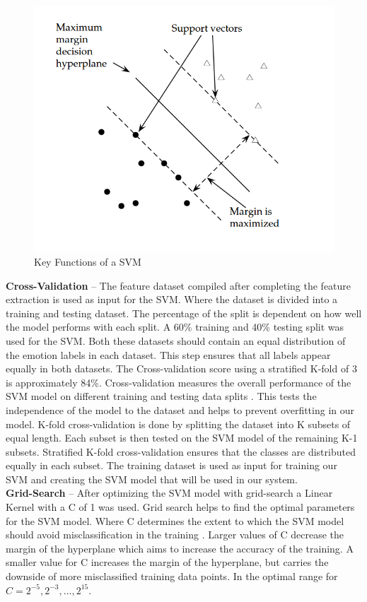 \begin{itemize}
\begin{figure}[H]
  \centering
  \includegraphics[scale=0.6]{svm}
  \caption{Key Functions of a SVM \cite{stan}}
  \label{fig: svm}
\end{figure} 

\textbf{Cross-Validation} -- The feature dataset compiled after completing the feature extraction is used as input for the SVM. Where the dataset is divided into a training and testing dataset. The percentage of the split is dependent on how well the model performs with each split. A 60\% training and 40\% testing split was used for the SVM. Both these datasets should contain an equal distribution of the emotion labels in each dataset. This step ensures that all labels appear equally in both datasets. The Cross-validation score using a stratified K-fold of 3 is approximately 84\%. Cross-validation measures the overall performance of the SVM model on different training and testing data splits \cite{svm}. This tests the independence of the model to the dataset and helps to prevent overfitting in our model. K-fold cross-validation is done by splitting the dataset into K subsets of equal length. Each subset is then tested on the SVM model of the remaining K-1 subsets. Stratified K-fold cross-validation ensures that the classes are distributed equally in each subset. The training dataset is used as input for training our SVM and creating the SVM model that will be used in our system.\\

\textbf{Grid-Search} -- After optimizing the SVM model with grid-search a Linear Kernel with a C of 1 was used. Grid search helps to find the optimal parameters for the SVM model. Where C determines the extent to which the SVM model should avoid misclassification in the training \cite{svm}. Larger values of C decrease the margin of the hyperplane which aims to increase the accuracy of the training. A smaller value for C increases the margin of the hyperplane, but carries the downside of more misclassified training data points. In \cite{svm} the optimal range for $C = 2^{-5}, 2^{-3}, ..., 2^{15}$. 


\end{itemize}
